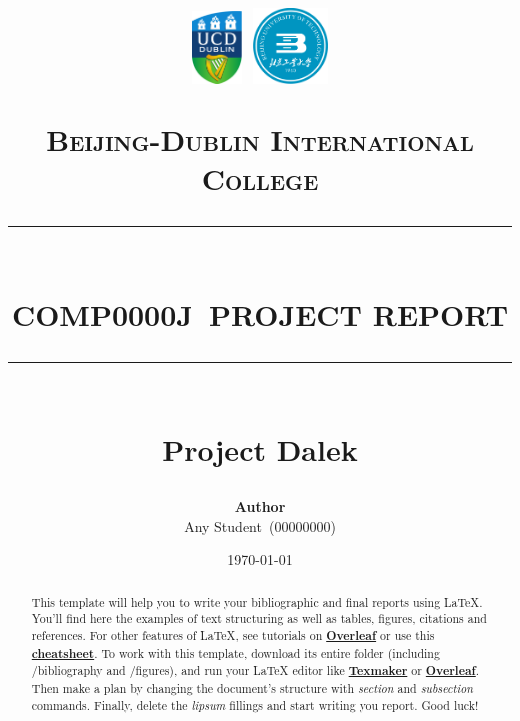 \documentclass{article}
\newcommand{\name}{Any Student}
\newcommand{\idnumber}{00000000}
\newcommand{\coursecode}{COMP0000J}
\newcommand{\paperdate}{\today}
\newcommand{\HRule}[1]{\rule{\linewidth}{#1}}
\begin{document}

\title{ \normalsize  \includegraphics[width=0.1\textwidth]{images/UCD_Logo.pdf} \textbf{ }
\includegraphics[width=0.15\textwidth]{images/BJUT_Logo.pdf} \par \textsc{Beijing-Dublin International College}
		\\ [2.0cm]
		\HRule{1.5pt} \\ [0.35cm]
		\LARGE \textbf{\uppercase{\coursecode \ Project Report}}
		\HRule{1.5pt} \\ [0.9cm] \textbf{\LARGE{Project Dalek}} \vspace*{10\baselineskip}
		}
\date{\paperdate}
\author{\textbf{Author} \\ 
    \name \ (\idnumber) \\
}

\maketitle
\newpage

\tableofcontents
\newpage


\begin{abstract}
    This template will help you to write your bibliographic and final reports using \LaTeX{}. You'll find here the examples of text structuring as well as tables, figures, citations and references. For other features of \LaTeX, see tutorials on \href{https://www.overleaf.com/learn}{\textbf{Overleaf}} or use this \href{https://wch.github.io/latexsheet/}{\textbf{cheatsheet}}. To work with this template, download its entire folder (including /bibliography and /figures), and run your \LaTeX{}  editor like \href{http://www.xm1math.net/texmaker/}{\textbf{Texmaker}} or \href{https://www.overleaf.com}{\textbf{Overleaf}}. Then make a plan by changing the document's structure with \textit{section} and \textit{subsection} commands. Finally, delete the \textit{lipsum} fillings and start writing you report. Good luck!
\end{abstract}
\end{document}
